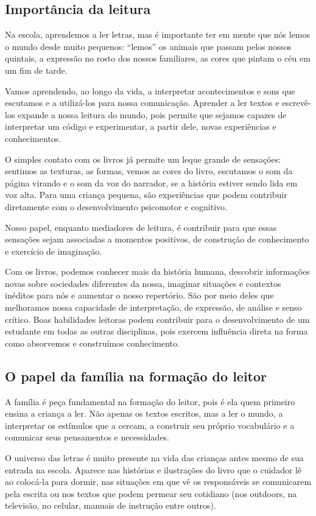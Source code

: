 \documentclass[11pt]{extarticle}
\begin{document}
\subsection{Importância da leitura}
Na escola, aprendemos a ler letras, mas é importante ter em mente que nós 
lemos o mundo desde muito pequenos: “lemos” os animais que passam pelos nossos 
quintais, a expressão no rosto dos nossos familiares, as cores que pintam o céu 
em um fim de tarde. 

Vamos aprendendo, ao longo da vida, a interpretar acontecimentos 
e sons que escutamos e a utilizá-los para nossa comunicação. Aprender a ler textos e 
escrevê-los expande a nossa leitura do mundo, pois permite que sejamos capazes de 
interpretar um código e experimentar, a partir dele, novas experiências e conhecimentos. 

O simples contato com os livros já permite um leque grande de sensações: 
sentimos as texturas, as formas, vemos as cores do livro, escutamos o som da página 
virando e o som da voz do narrador, se a história estiver sendo lida em voz alta. Para uma 
criança pequena, são experiências que podem contribuir diretamente com o desenvolvimento psicomotor 
e cognitivo. 

Nosso papel, enquanto mediadores de leitura, é contribuir para que essas 
sensações sejam associadas a momentos positivos, de construção de 
conhecimento e exercício de imaginação. 

Com os livros, podemos conhecer mais da história humana, descobrir informações 
novas sobre sociedades diferentes da nossa, imaginar situações e contextos inéditos 
para nós e aumentar o nosso repertório. São por meio deles que melhoramos nossa 
capacidade de interpretação, de expressão, de análise e senso crítico. Boas habilidades 
leitoras podem contribuir para o desenvolvimento de um estudante em todas as outras 
disciplinas, pois exercem influência direta na forma como absorvemos e 
construímos conhecimento.


\subsection{O papel da família na formação do leitor}
A família é peça fundamental na formação do leitor, pois é ela quem primeiro 
ensina a criança a ler. Não apenas os textos escritos, mas a ler o mundo, a 
interpretar os estímulos que a cercam, a construir seu próprio vocabulário e a 
comunicar seus pensamentos e necessidades.

O universo das letras é muito presente na vida das crianças antes mesmo de sua 
entrada na escola. Aparece nas histórias e ilustrações do livro que o cuidador 
lê ao colocá-la para dormir, nas situações em que vê os responsáveis se comunicarem 
pela escrita ou nos textos que podem permear seu cotidiano (nos outdoors, na 
televisão, no celular, manuais de instrução entre outros). 
\end{document}
